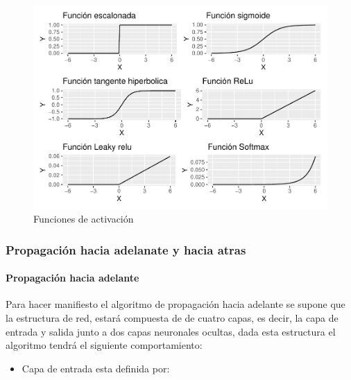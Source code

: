\documentclass[
  12pt,
]{article}
\providecommand{\tightlist}{%
  \setlength{\itemsep}{0pt}\setlength{\parskip}{0pt}}
\begin{document}
\begin{figure}

{\centering \includegraphics[width=1\linewidth,height=0.7\textheight]{PRINCIPAL-INVESTIGACION_files/figure-latex/unnamed-chunk-11-1} 

}

\caption{Funciones de activación}\label{fig:unnamed-chunk-11}
\end{figure}

\newpage

\hypertarget{propagaciuxf3n-hacia-adelanate-y-hacia-atras}{%
\subsubsection{Propagación hacia adelanate y hacia
atras}\label{propagaciuxf3n-hacia-adelanate-y-hacia-atras}}

\hypertarget{propagaciuxf3n-hacia-adelante}{%
\paragraph{Propagación hacia
adelante}\label{propagaciuxf3n-hacia-adelante}}

Para hacer manifiesto el algoritmo de propagación hacia adelante se
supone que la estructura de red, estará compuesta de de cuatro capas, es
decir, la capa de entrada y salida junto a dos capas neuronales ocultas,
dada esta estructura el algoritmo tendrá el siguiente comportamiento:

\begin{itemize}
\tightlist
\item
  Capa de entrada esta definida por:
\end{itemize}
\end{document}
